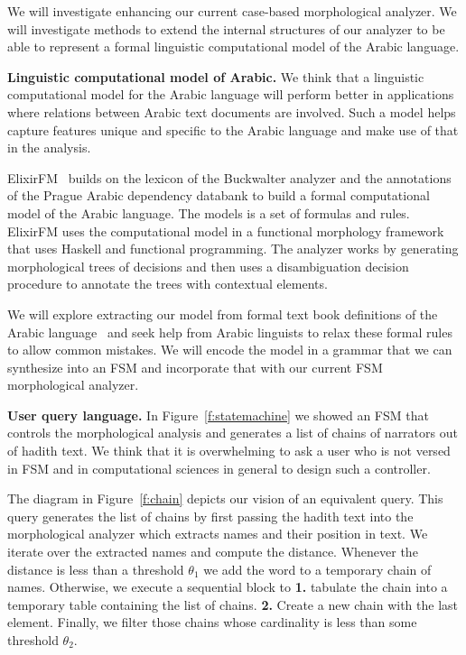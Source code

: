 \documentclass[12pt]{article}
\begin{document}
{We will investigate enhancing our current case-based morphological
analyzer.
We will investigate methods to extend the internal structures 
of our analyzer to be able to represent a formal linguistic
computational model of the Arabic language. 

{\bf Linguistic computational model of Arabic.}
We think that a linguistic computational model for the Arabic
language will perform better in applications where
relations between Arabic text documents are involved. 
Such a model helps capture features unique and specific 
to the Arabic language and make use of that in the analysis.

ElixirFM~\cite{Otakar:07} builds on the lexicon
of the Buckwalter analyzer and the annotations of the 
Prague Arabic dependency databank to build a formal 
computational model of the Arabic language.
The models is a set of formulas and rules. 
ElixirFM uses the computational model in a functional
morphology framework that uses Haskell and functional
programming. 
The analyzer works by generating morphological trees of 
decisions and then uses a disambiguation decision procedure 
to annotate the trees with contextual elements. 

We will explore extracting our model from formal text book
definitions of the Arabic language~\cite{Abd00,Abd001} and seek
help from Arabic linguists to relax these formal rules to
allow common mistakes. 
We will encode the model in a grammar that we can synthesize
into an FSM and incorporate that with our current FSM 
morphological analyzer. 


{\bf User query language. }
In Figure~\ref{f:statemachine} we showed an FSM 
that controls the morphological analysis and generates a
list of chains of narrators out of hadith text.
We think that it is overwhelming to ask a user who is not 
versed in FSM and in computational sciences in general 
to design such a controller. 

The diagram in Figure~\ref{f:chain} depicts our vision of 
an equivalent query.
This query generates the list of chains by first passing the 
hadith text into the morphological analyzer which 
extracts names and their position in text. 
We iterate over the extracted names and compute the distance.
Whenever the distance is less than a threshold $\theta_1$
we add the word to a temporary chain of names. 
Otherwise, we execute a sequential block to 
{\bf 1.} tabulate the chain into a temporary table containing 
the list of chains. 
{\bf 2.} Create a new chain with the last element.
Finally, we filter those chains whose cardinality 
is less than some threshold  $\theta_2$.

}
\end{document}
